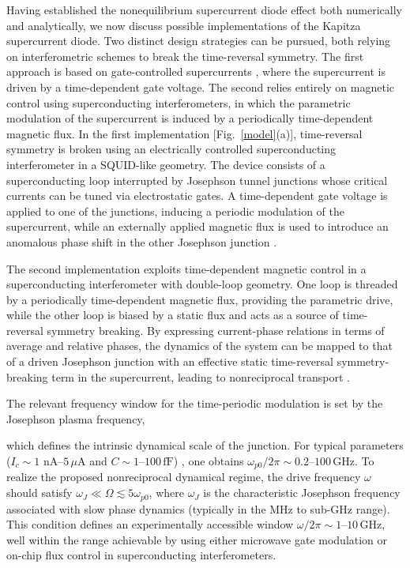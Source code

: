 \documentclass[prl,twocolumn,superscriptaddress,showpacs,nofootinbib]{revtex4-2}
\begin{document}
Having established the nonequilibrium supercurrent diode effect both numerically and analytically, we now discuss possible implementations of the Kapitza supercurrent diode. Two distinct design strategies can be pursued, both relying on interferometric schemes to break the time-reversal symmetry. The first approach is based on gate-controlled supercurrents \cite{Ruf2024,DeSimoni2019,Mercaldo2020,Paolucci2019}, where the supercurrent is driven by a time-dependent gate voltage. The second relies entirely on magnetic control using superconducting interferometers, in which the parametric modulation of the supercurrent is induced by a periodically time-dependent magnetic flux.
In the first implementation [Fig.~\ref{model}(a)], time-reversal symmetry is broken using an electrically controlled superconducting interferometer in a SQUID-like geometry. The device consists of a superconducting loop interrupted by Josephson tunnel junctions whose critical currents can be tuned via electrostatic gates. A time-dependent gate voltage is applied to one of the junctions, inducing a periodic modulation of the supercurrent, while an externally applied magnetic flux is used to introduce an anomalous phase shift in the other Josephson junction \cite{SM}.

The second implementation exploits time-dependent magnetic control in a superconducting interferometer with double-loop geometry. One loop is threaded by a periodically time-dependent magnetic flux, providing the parametric drive, while the other loop is biased by a static flux and acts as a source of time-reversal symmetry breaking.
By expressing current-phase relations in terms of average and relative phases, the dynamics of the system can be mapped to that of a driven Josephson junction with an effective static time-reversal symmetry-breaking term in the supercurrent, leading to nonreciprocal transport \cite{SM}.

The relevant frequency window for the time-periodic modulation is set by the Josephson plasma frequency,

which defines the intrinsic dynamical scale of the junction. For typical parameters ($I_c\sim 1$ nA--$5\,\mu\mathrm{A}$ and $C\sim 1$--$100\,\mathrm{fF}$) \cite{Golubov2004}, one obtains $\omega_{p0}/2\pi \sim 0.2$--$100\,\mathrm{GHz}$. To realize the proposed nonreciprocal dynamical regime, the drive frequency $\omega$ should satisfy $\omega_J \ll \Omega \lesssim 5 \omega_{p0}$, where $\omega_J$ is the characteristic Josephson frequency associated with slow phase dynamics (typically in the MHz to sub-GHz range). This condition defines an experimentally accessible window $ \omega/2\pi \sim 1$--$10\,\mathrm{GHz}$, well within the range achievable by using either microwave gate modulation or on-chip flux control in superconducting interferometers.
\end{document}
